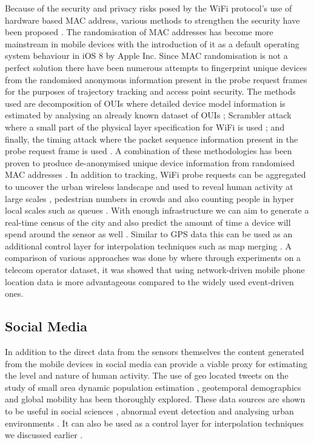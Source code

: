Because of the security and privacy risks posed by the WiFi protocol’s use of hardware based MAC address, various methods to strengthen the security have been proposed \citep{pang2007, greenstein2008}.
The randomisation of MAC addresses has become more mainstream in mobile devices with the introduction of it as a default operating system behaviour in iOS 8 by Apple Inc.
Since MAC randomisation is not a perfect solution \citep{cunche2016} there have been numerous attempts to fingerprint unique devices from the randomised anonymous information present in the probe request frames for the purposes of trajectory tracking and access point security.
The methods used are decomposition of OUIs where detailed device model information is estimated by analysing an already known dataset of OUIs \citep{martin2016}; Scrambler attack where a small part of the physical layer specification for WiFi is used \citep{bloessl2015}; and finally, the timing attack where the packet sequence information present in the probe request frame is used \citep{matte2016, cheng2016}.
A combination of these methodologies has been proven to produce de-anonymised unique device information from randomised MAC addresses \citep{vanhoef2016}.
In addition to tracking, WiFi probe requests can be aggregated to uncover the urban wireless landscape \citep{rose2010} and used to reveal human activity at large scales \citep{qin2013}, pedestrian numbers in crowds \citep{schauer2014, fukuzaki2015} and also counting people in hyper local scales such as queues \citep{wang2013}.
With enough infrastructure we can aim to generate a real-time census of the city \citep{kontokosta2016} and also predict the amount of time a device will spend around the sensor as well \citep{manweiler2013}.
Similar to GPS data this can be used as an additional control layer for interpolation techniques such as map merging \citep{erinc2013}.
A comparison of various approaches was done by \citep{pinelli2015} where through experiments on a telecom operator dataset, it was showed that using network-driven mobile phone location data is more advantageous compared to the widely used event-driven ones.

\subsection{Social Media}

In addition to the direct data from the sensors themselves the content generated from the mobile devices in social media can provide a viable proxy for estimating the level and nature of human activity.
The use of geo located tweets on the study of small area dynamic population estimation \citep{ordonez2012, marchetti2015, mckenzie2015}, geotemporal demographics \citep{bawa-cavia2011, longley2015, lansley2016} and global mobility \citep{hawelka2014} has been thoroughly explored.
These data sources are shown to be useful in social sciences \citep{crane2008}, abnormal event detection \citep{chae2012} and analysing urban environments \citep{sagl2012}.
It can also be used as a control layer for interpolation techniques we discussed earlier \citep{lin2015}.


